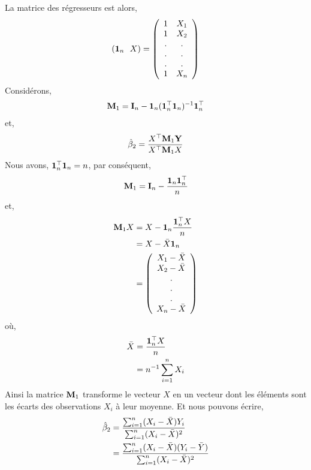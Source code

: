 La matrice des régresseurs est alors,
\begin{align*}
 \left(\mathbf{1}_n \ \ X\right) = 
\left(
\begin{array}{cc}
1&X_1\\
1&X_2\\
.&.\\
.&.\\
.&.\\
1&X_n
\end{array}
\right)
\end{align*}
Considérons,
\begin{align*}
\mathbf M_1 = \mathbf{I}_n - \mathbf{1}_n(\mathbf{1}_n^\top\mathbf{1}_n)^{-1}\mathbf{1}_n^\top
\end{align*}
et,
\begin{align*}
\hat{\beta}_2 = \frac{X^\top\mathbf M_1\mathbf Y}{X^\top\mathbf M_1X}
\end{align*}
Nous avons, $\mathbf{1}_n^\top\mathbf{1}_n = n$, par conséquent,
\begin{align*}
\mathbf M_1 = \mathbf{I}_n - \frac{\mathbf{1}_n\mathbf{1}_n^\top}{n}
\end{align*}
et,
\begin{align*}
\mathbf M_1X &= X - \mathbf{1}_n\frac{\mathbf{1}_n^\top X}{n}\\
& = X - \bar{X}\mathbf{1}_n\\
& = 
\left(
\begin{array}{c}
X_1 - \bar{X}\\
X_2 - \bar{X}\\
.\\
.\\
.\\
X_n - \bar{X}
\end{array}
\right)
\end{align*}
où,
\begin{align*}
\bar{X} &= \frac{\mathbf{1}_n^\top X}{n}\\
&=n^{-1}\sum_{i=1}^n X_i
\end{align*}
Ainsi la matrice $\mathbf M_1$ transforme le vecteur $X$ en un vecteur dont les éléments sont les écarts des observations $X_i$ à leur moyenne. Et nous pouvons écrire,
\begin{align*}
\hat{\beta}_2 &= \frac{\sum_{i=1}^n(X_i - \bar{X})Y_i}{\sum_{i=1}^n(X_i - \bar{X}) ^2}\\
&= \frac{\sum_{i=1}^n(X_i - \bar{X})(Y_i - \bar{Y})}{\sum_{i=1}^n(X_i - \bar{X}) ^2}
\end{align*}

